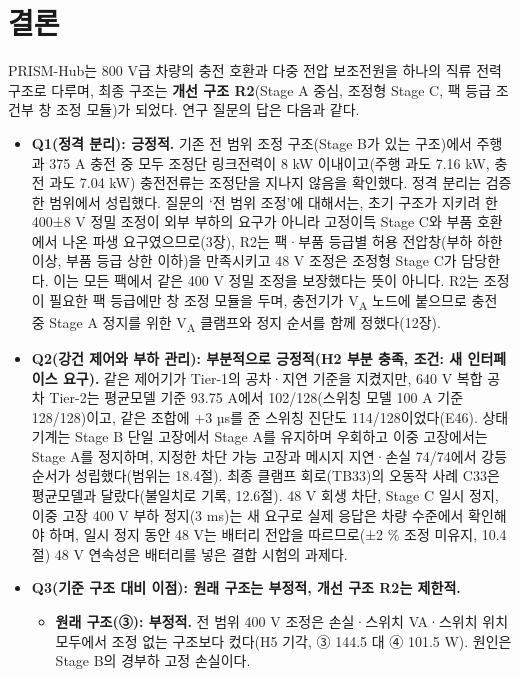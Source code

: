 \chapter{결론}

PRISM-Hub는 800 V급 차량의 충전 호환과 다중 전압 보조전원을 하나의 직류 전력 구조로 다루며, 최종 구조는 \textbf{개선 구조 R2}(Stage A 중심, 조정형 Stage C, 팩 등급 조건부 창 조정 모듈)가 되었다. 연구 질문의 답은 다음과 같다.

\begin{itemize}
\item \textbf{Q1(정격 분리): 긍정적.} 기존 전 범위 조정 구조(Stage B가 있는 구조)에서 주행과 375 A 충전 중 모두 조정단 링크전력이 8 kW 이내이고(주행 과도 7.16 kW, 충전 과도 7.04 kW) 충전전류는 조정단을 지나지 않음을 확인했다. 정격 분리는 검증한 범위에서 성립했다. 질문의 ‘전 범위 조정’에 대해서는, 초기 구조가 지키려 한 400±8 V 정밀 조정이 외부 부하의 요구가 아니라 고정이득 Stage C와 부품 호환에서 나온 파생 요구였으므로(3장), R2는 팩·부품 등급별 허용 전압창(부하 하한 이상, 부품 등급 상한 이하)을 만족시키고 48 V 조정은 조정형 Stage C가 담당한다. 이는 모든 팩에서 같은 400 V 정밀 조정을 보장했다는 뜻이 아니다. R2는 조정이 필요한 팩 등급에만 창 조정 모듈을 두며, 충전기가 V\textsubscript{A} 노드에 붙으므로 충전 중 Stage A 정지를 위한 V\textsubscript{A} 클램프와 정지 순서를 함께 정했다(12장).
\item \textbf{Q2(강건 제어와 부하 관리): 부분적으로 긍정적(H2 부분 충족, 조건: 새 인터페이스 요구).} 같은 제어기가 Tier-1의 공차·지연 기준을 지켰지만, 640 V 복합 공차 Tier-2는 평균모델 기준 93.75 A에서 102/128(스위칭 모델 100 A 기준 128/128)이고, 같은 조합에 +3 µs를 준 스위칭 진단도 114/128이었다(E46). 상태기계는 Stage B 단일 고장에서 Stage A를 유지하며 우회하고 이중 고장에서는 Stage A를 정지하며, 지정한 차단 가능 고장과 메시지 지연·손실 74/74에서 강등 순서가 성립했다(범위는 18.4절). 최종 클램프 회로(TB33)의 오동작 사례 C33은 평균모델과 달랐다(불일치로 기록, 12.6절). 48 V 회생 차단, Stage C 일시 정지, 이중 고장 400 V 부하 정지(3 ms)는 새 요구로 실제 응답은 차량 수준에서 확인해야 하며, 일시 정지 동안 48 V는 배터리 전압을 따르므로(±2 \% 조정 미유지, 10.4절) 48 V 연속성은 배터리를 넣은 결합 시험의 과제다.
\item \textbf{Q3(기준 구조 대비 이점): 원래 구조는 부정적, 개선 구조 R2는 제한적.}
\begin{itemize}
\item \textbf{원래 구조(③): 부정적.} 전 범위 400 V 조정은 손실·스위치 VA·스위치 위치 모두에서 조정 없는 구조보다 컸다(H5 기각, ③ 144.5 대 ④ 101.5 W). 원인은 Stage B의 경부하 고정 손실이다.

\end{itemize}
\end{itemize}
